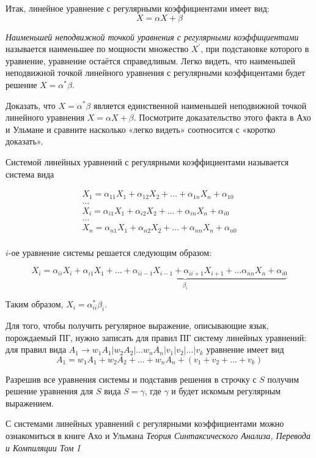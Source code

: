 \documentclass[12pt]{article}
\theoremstyle{definiton}
\theoremstyle{definition}
\theoremstyle{definition}
\newcounter{problem}
\newcounter{uproblem}
\newcounter{subproblem}
\def\upr{\medskip\noindent\stepcounter{uproblem}{\bf Упражнение \theuproblem .  }\setcounter{subproblem}{0} }
\begin{document}
Итак, линейное уравнение с регулярными коэффициентами имеет вид:
\[ X = \alpha X + \beta\]

\emph{Наименьшей неподвижной точкой уравнения с регулярными коэффициентами} называется наименьшее по мощности множество $X^\prime$, при подстановке которого в уравнение, уравнение остаётся справедливым. Легко видеть, что наименьшей неподвижной точкой линейного уравнения с регулярными коэффицентами будет решение $X = \alpha^*\beta$.

\upr Доказать, что $X = \alpha^*\beta$ является единственной наименьшей неподвижной точкой линейного уравнения $X = \alpha X + \beta$. Посмотрите доказательство этого факта в Ахо и Ульмане и сравните насколько «легко видеть» соотносится с «коротко доказать».
\medskip

Системой линейных уравнений с регулярными коэффициентами называется система вида

\begin{gather*}
	 X_1 = \alpha_{11}X_1 + \alpha_{12}X_2 + \ldots + \alpha_{1n}X_n + \alpha_{10}\\
	 \hdots\\
	 X_i = \alpha_{i1}X_1 + \alpha_{i2}X_2 + \ldots + \alpha_{in}X_n + \alpha_{i0}\\
	 \hdots\\
	 X_n = \alpha_{n1}X_1 + \alpha_{n2}X_2 + \ldots + \alpha_{nn}X_n + \alpha_{n0}\\
\end{gather*}

$i$-ое уравнение системы решается следующим образом:

\[ X_i = \alpha_{ii}X_i + \underbrace{\alpha_{i1}X_1 + \ldots+ \alpha_{i i-1}X_{i-1} + \alpha_{i i+1}X_{i+1} + \ldots \alpha_{nn}X_n + \alpha_{i0}}_{\beta_i} \]

Таким образом, $X_i = \alpha^*_{ii}\beta_i$.

Для того, чтобы получить регулярное выражение, описывающие язык, порождаемый ПГ, нужно записать для правил ПГ систему линейных уравнений: для правил вида $ A_1 \to w_1A_1 | w_2A_2| \ldots w_nA_n| v_1|v_2|\ldots|v_k$ уравнение имеет вид
\[ A_1  = w_1A_1 + w_2A_2 + \ldots + w_n A_n + (v_1 + v_2 + \ldots + v_k) \]

Разрешив все уравнения системы и подставив решения в строчку с $S$ получим решение уравнения для $S$ вида $S = \gamma$, где $\gamma$ и будет искомым регулярным выражением.


 С системами линейных уравнений с регулярными коэффициентами можно ознакомиться  в книге Ахо и Ульмана {\it Теория Синтаксического Анализа, Перевода и Компиляции Том I}
\end{document}
